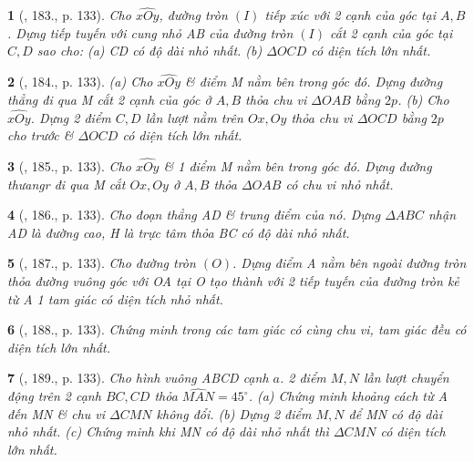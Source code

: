 \documentclass{article}
\newtheorem{baitoan}{}
\begin{document}
\begin{baitoan}[\cite{Binh_Toan_9_tap_1}, 183., p. 133]
	Cho $\widehat{xOy}$, đường tròn $(I)$ tiếp xúc với 2 cạnh của góc tại $A,B$. Dựng tiếp tuyến với cung nhỏ AB của đường tròn $(I)$ cắt 2 cạnh của góc tại $C,D$ sao cho: (a) CD có độ dài nhỏ nhất. (b) $\Delta OCD$ có diện tích lớn nhất.
\end{baitoan}

\begin{baitoan}[\cite{Binh_Toan_9_tap_1}, 184., p. 133]
	(a) Cho $\widehat{xOy}$ \& điểm M nằm bên trong góc đó. Dựng đường thẳng đi qua M cắt 2 cạnh của góc ở $A,B$ thỏa chu vi $\Delta OAB$ bằng $2p$. (b) Cho $\widehat{xOy}$. Dựng 2 điểm $C,D$ lần lượt nằm trên $Ox,Oy$ thỏa chu vi $\Delta OCD$ bằng $2p$ cho trước \& $\Delta OCD$ có diện tích lớn nhất.
\end{baitoan}

\begin{baitoan}[\cite{Binh_Toan_9_tap_1}, 185., p. 133]
	Cho $\widehat{xOy}$ \& 1 điểm M nằm bên trong góc đó. Dựng đường thưangr đi qua M cắt $Ox,Oy$ ở $A,B$ thỏa $\Delta OAB$ có chu vi nhỏ nhất.
\end{baitoan}

\begin{baitoan}[\cite{Binh_Toan_9_tap_1}, 186., p. 133]
	Cho đoạn thẳng AD \& trung điểm của nó. Dựng $\Delta ABC$ nhận AD là đường cao, H là trực tâm thỏa BC có độ dài nhỏ nhất.
\end{baitoan}

\begin{baitoan}[\cite{Binh_Toan_9_tap_1}, 187., p. 133]
	Cho đường tròn $(O)$. Dựng điểm A nằm bên ngoài đường tròn thỏa đường vuông góc với OA tại O tạo thành với 2 tiếp tuyến của đường tròn kẻ từ A 1 tam giác có diện tích nhỏ nhất.
\end{baitoan}

\begin{baitoan}[\cite{Binh_Toan_9_tap_1}, 188., p. 133]
	Chứng minh trong các tam giác có cùng chu vi, tam giác đều có diện tích lớn nhất.
\end{baitoan}

\begin{baitoan}[\cite{Binh_Toan_9_tap_1}, 189., p. 133]
	Cho hình vuông ABCD cạnh $a$. 2 điểm $M,N$ lần lượt chuyển động trên 2 cạnh $BC,CD$ thỏa $\widehat{MAN} = 45^\circ$. (a) Chứng minh khoảng cách từ A đến MN \& chu vi $\Delta CMN$ không đổi. (b) Dựng 2 điểm $M,N$ để MN có độ dài nhỏ nhất. (c) Chứng minh khi MN có độ dài nhỏ nhất thì $\Delta CMN$ có diện tích lớn nhất.
\end{baitoan}
\end{document}
